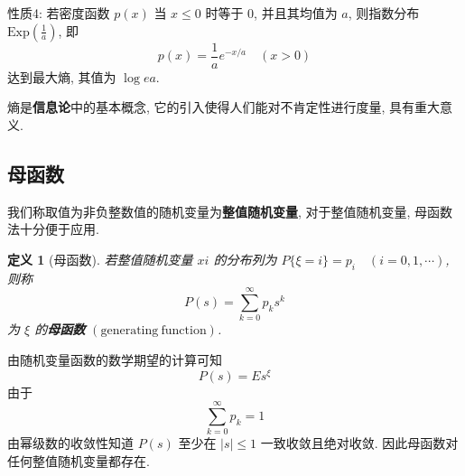 \documentclass[12pt,a4paper]{article}
\newtheorem{definition}{定义}[subsection] %
\begin{document}
性质4: 若密度函数 $p(x)$ 当 $x \leq 0$ 时等于 $0$, 并且其均值为 $a$, 则指数分布 $\mathrm{Exp}(\frac{1}{a})$, 即 \[p(x) = \frac{1}{a} e^{-x/a} \quad (x>0)\]
达到最大熵, 其值为 $\log ea$.

熵是\textbf{信息论}中的基本概念, 它的引入使得人们能对不肯定性进行度量, 具有重大意义.

\subsection{母函数}
我们称取值为非负整数值的随机变量为\textbf{整值随机变量}, 对于整值随机变量, 母函数法十分便于应用.
\begin{definition}[母函数]
    若整值随机变量 $xi$ 的分布列为 $P\{\xi = i\} = p_i \quad (i=0,1,\cdots)$, 则称
    \[P(s) = \sum\limits_{k=0}^{\infty} p_k s^k\] 为 $\xi$ 的\textbf{母函数} $(\mathrm{generating \ function})$. 
\end{definition}
由随机变量函数的数学期望的计算可知 \[P(s) = E s^{\xi}\]
由于\[\sum\limits_{k=0}^{\infty} p_k = 1\] 由幂级数的收敛性知道 $P(s)$ 至少在 $|s| \leq 1$ 一致收敛且绝对收敛.
因此母函数对任何整值随机变量都存在.
\end{document}
